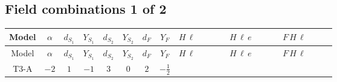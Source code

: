 \documentclass[8pt]{article}
\begin{document}
\begin{landscape}
\subsection*{Field combinations 1 of 2}
\begin{longtable}{@{}cccccccc >{\raggedright\arraybackslash}p{0.21\linewidth} >{\raggedright\arraybackslash}p{0.21\linewidth} >{\raggedright\arraybackslash}p{0.21\linewidth}@{}}
\toprule
Model & $\alpha$ & $d_{S_1}$ & $Y_{S_1}$ & $d_{S_2}$ & $Y_{S_2}$ & $d_F$ & $Y_F$ & $H\,\ell$ & $H\,\ell\,e$ & $F\,H\,\ell$ \\
\midrule
\endfirsthead
\toprule
Model & $\alpha$ & $d_{S_1}$ & $Y_{S_1}$ & $d_{S_2}$ & $Y_{S_2}$ & $d_F$ & $Y_F$ & $H\,\ell$ & $H\,\ell\,e$ & $F\,H\,\ell$ \\
\midrule
\endhead
T3-A & $-2$ & $1$ & $-1$ & $3$ & $0$ & $2$ & $-\frac{1}{2}$ & \scriptsize\adjustbox{max width=\linewidth}{$\begin{gathered} +\frac{2 \hbar  \overline{y_{1,i_1,r_1}} \overline{y_{2,i_2,r_1}} L_{a_4,i_2}{}^T\, C\, P_L\, L_{a_2,i_1} H_{a_1} H_{a_3} \lambda_5 \epsilon_{a_1,a_2} \epsilon_{a_3,a_4}}{\sqrt{3} \epsilon  M_F} \\ +\frac{2 \hbar  \overline{y_{1,i_1,r_1}} \overline{y_{2,i_2,r_1}} L_{a_4,i_2}{}^T\, C\, P_L\, L_{a_2,i_1} H_{a_1} H_{a_3} \lambda_5 \epsilon_{a_1,a_2} \epsilon_{a_3,a_4}}{\sqrt{3} M_F} \\ +\frac{2 \hbar  \overline{\lambda_5} \overline{L_{a_3,i_1}}\, C\, P_R\, \overline{L_{a_4,i_2}}{}^T y_{1,i_1,r_1} y_{2,i_2,r_1} \epsilon_{a_1,a_3} \epsilon_{a_2,a_4} H_{a_1}{}^{\dagger } H_{a_2}{}^{\dagger }}{\sqrt{3} \epsilon  M_F}\end{gathered}$} & \scriptsize\adjustbox{max width=\linewidth}{$\begin{gathered} \frac{\hbar  \overline{y_{1,i_3,r_1}} \overline{L_{a_1,i_2}}\, P_R\, e_{i_1} H_{a_1} y_{1,i_2,r_1} Y_{e,i_3,i_1}}{4 \epsilon } \\ +\frac{3}{8} \hbar  \overline{y_{1,i_3,r_1}} \overline{L_{a_1,i_2}}\, P_R\, e_{i_1} H_{a_1} y_{1,i_2,r_1} Y_{e,i_3,i_1} \\ +\frac{\sqrt{3} \hbar  \overline{y_{2,i_3,r_1}} \overline{L_{a_1,i_2}}\, P_R\, e_{i_1} H_{a_1} y_{2,i_2,r_1} Y_{e,i_3,i_1}}{4 \epsilon }\end{gathered}$} & \scriptsize\adjustbox{max width=\linewidth}{$\begin{gathered} +\frac{2 \hbar  \log \left(\frac{\bar{\mu}^{2}}{M_F^2}\right) \overline{y_{1,i_1,r_1}} \overline{y_{2,i_2,r_1}} L_{a_4,i_2}{}^T\, C\, P_L\, L_{a_2,i_1} H_{a_1} H_{a_3} \lambda_5 \epsilon_{a_1,a_2} \epsilon_{a_3,a_4}}{\sqrt{3} M_F} \\ +\frac{2 \hbar  \log \left(\frac{\bar{\mu}^{2}}{M_F^2}\right) \overline{\lambda_5} \overline{L_{a_3,i_1}}\, C\, P_R\, \overline{L_{a_4,i_2}}{}^T y_{1,i_1,r_1} y_{2,i_2,r_1} \epsilon_{a_1,a_3} \epsilon_{a_2,a_4} H_{a_1}{}^{\dagger } H_{a_2}{}^{\dagger }}{\sqrt{3} M_F}\end{gathered}$} \\

\end{longtable}
\end{landscape}
\end{document}
